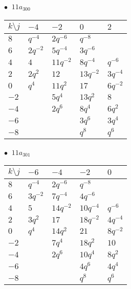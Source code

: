 \begin{minipage}{\linewidth}
$\bullet\ $ $11a_{300}$ \vspace{0.5em} \\
\begin{tabular}{l|llll}
$k \setminus j$ & $-4$ & $-2$ & $0$ & $2$ \\
\hline
$8$ & $q^{-4}$ & $2q^{-6}$ & $q^{-8}$ &  \\
$6$ & $2q^{-2}$ & $5q^{-4}$ & $3q^{-6}$ &  \\
$4$ & $4$ & $11q^{-2}$ & $8q^{-4}$ & $q^{-6}$ \\
$2$ & $2q^{2}$ & $12$ & $13q^{-2}$ & $3q^{-4}$ \\
$0$ & $q^{4}$ & $11q^{2}$ & $17$ & $6q^{-2}$ \\
$-2$ &  & $5q^{4}$ & $13q^{2}$ & $8$ \\
$-4$ &  & $2q^{6}$ & $8q^{4}$ & $6q^{2}$ \\
$-6$ &  &  & $3q^{6}$ & $3q^{4}$ \\
$-8$ &  &  & $q^{8}$ & $q^{6}$ \\
\end{tabular}
\vspace{2em}
\end{minipage}
%
\begin{minipage}{\linewidth}
$\bullet\ $ $11a_{301}$ \vspace{0.5em} \\
\begin{tabular}{l|llll}
$k \setminus j$ & $-6$ & $-4$ & $-2$ & $0$ \\
\hline
$8$ & $q^{-4}$ & $2q^{-6}$ & $q^{-8}$ &  \\
$6$ & $3q^{-2}$ & $7q^{-4}$ & $4q^{-6}$ &  \\
$4$ & $5$ & $14q^{-2}$ & $10q^{-4}$ & $q^{-6}$ \\
$2$ & $3q^{2}$ & $17$ & $18q^{-2}$ & $4q^{-4}$ \\
$0$ & $q^{4}$ & $14q^{2}$ & $21$ & $8q^{-2}$ \\
$-2$ &  & $7q^{4}$ & $18q^{2}$ & $10$ \\
$-4$ &  & $2q^{6}$ & $10q^{4}$ & $8q^{2}$ \\
$-6$ &  &  & $4q^{6}$ & $4q^{4}$ \\
$-8$ &  &  & $q^{8}$ & $q^{6}$ \\
\end{tabular}
\vspace{2em}
\end{minipage}
%
